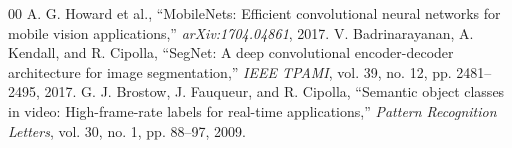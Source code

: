 \documentclass[conference]{IEEEtran}
\begin{document}

\begin{thebibliography}{00}
 A. G. Howard et al., ``MobileNets: Efficient convolutional neural networks for mobile vision applications,'' \textit{arXiv:1704.04861}, 2017.
 V. Badrinarayanan, A. Kendall, and R. Cipolla, ``SegNet: A deep convolutional encoder-decoder architecture for image segmentation,'' \textit{IEEE TPAMI}, vol. 39, no. 12, pp. 2481--2495, 2017.
 G. J. Brostow, J. Fauqueur, and R. Cipolla, ``Semantic object classes in video: High-frame-rate labels for real-time applications,'' \textit{Pattern Recognition Letters}, vol. 30, no. 1, pp. 88--97, 2009.
\end{thebibliography}
\end{document}
